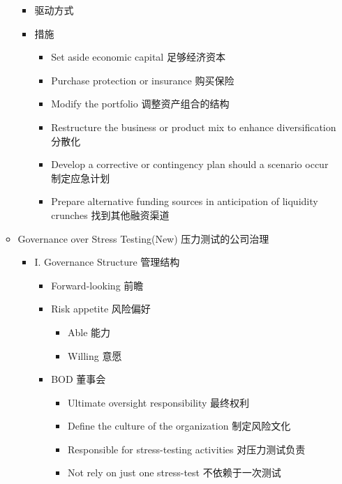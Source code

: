 \documentclass[a4paper,6pt,twoside,openany]{article}
\begin{document}
\begin{itemize}
\begin{itemize}
\begin{itemize}
\begin{itemize}
      \end{itemize}
    \item 驱动方式
  \item 措施
    \begin{itemize}
    \item Set aside economic capital 足够经济资本
    \item Purchase protection or insurance 购买保险
    \item Modify the portfolio 调整资产组合的结构
    \item Restructure the business or product mix to enhance diversification 分散化
    \item Develop a corrective or contingency plan should a scenario occur 制定应急计划
    \item Prepare alternative funding sources in anticipation of liquidity crunches 找到其他融资渠道
    \end{itemize}
  \end{itemize}
\item Governance over Stress Testing(New) 压力测试的公司治理
  \begin{itemize}
  \item I. Governance Structure 管理结构
    \begin{itemize}
    \item Forward-looking 前瞻
    \item Risk appetite 风险偏好
      \begin{itemize}
      \item Able 能力
      \item Willing 意愿
      \end{itemize}
    \item BOD 董事会
      \begin{itemize}
      \item Ultimate oversight responsibility 最终权利
      \item Define the culture of the organization 制定风险文化
      \item Responsible for stress-testing activities 对压力测试负责
      \item Not rely on just one stress-test 不依赖于一次测试

\end{itemize}
\end{itemize}
\end{itemize}
\end{itemize}
\end{itemize}
\end{document}
